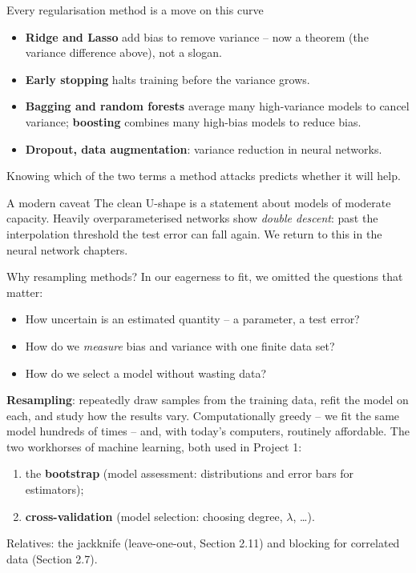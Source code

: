\documentclass[10pt,aspectratio=169]{beamer}
\begin{document}
\begin{frame}{Every regularisation method is a move on this curve}
\begin{itemize}
  \item \textbf{Ridge and Lasso} add bias to remove variance -- now a theorem
        (the variance difference above), not a slogan.
  \item \textbf{Early stopping} halts training before the variance grows.
  \item \textbf{Bagging and random forests} average many high-variance models
        to cancel variance; \textbf{boosting} combines many high-bias models
        to reduce bias.
  \item \textbf{Dropout, data augmentation}: variance reduction in neural
        networks.
\end{itemize}
Knowing which of the two terms a method attacks predicts whether it will help.
\vspace{4pt}
\begin{block}{A modern caveat}
The clean U-shape is a statement about models of moderate capacity.  Heavily
overparameterised networks show \emph{double descent}: past the interpolation
threshold the test error can fall again.  We return to this in the neural
network chapters.
\end{block}
\end{frame}


\begin{frame}{Why resampling methods?}
In our eagerness to fit, we omitted the questions that matter:
\begin{itemize}
  \item How uncertain is an estimated quantity -- a parameter, a test error?
  \item How do we \emph{measure} bias and variance with one finite data set?
  \item How do we select a model without wasting data?
\end{itemize}
\textbf{Resampling}: repeatedly draw samples from the training data, refit
the model on each, and study how the results vary.  Computationally greedy --
we fit the same model hundreds of times -- and, with today's computers,
routinely affordable.
\vspace{4pt}
The two workhorses of machine learning, both used in Project 1:
\begin{enumerate}
  \item the \textbf{bootstrap} (model assessment: distributions and error
        bars for estimators);
  \item \textbf{cross-validation} (model selection: choosing degree,
        $\lambda$, \dots).
\end{enumerate}
Relatives: the jackknife (leave-one-out, Section 2.11) and blocking for
correlated data (Section 2.7).
\end{frame}
\end{document}
